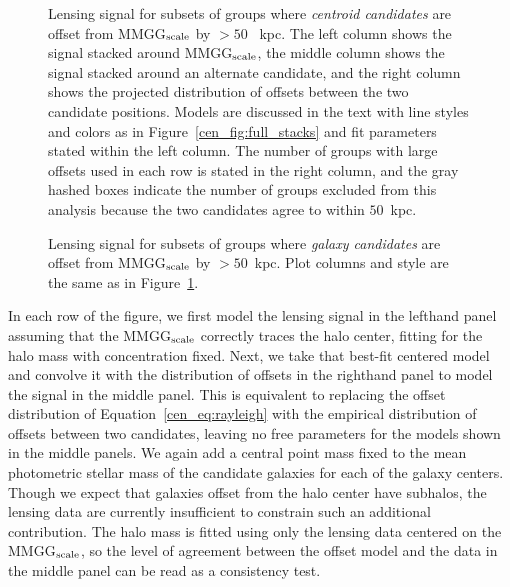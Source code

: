 \begin{figure*}[htb]
\caption{Lensing signal for subsets of groups where \textit{centroid
    candidates} are offset from MMGG$_{\rm scale}$ by $>50$~{\rm
    kpc}. The left column shows the signal stacked around MMGG$_{\rm
    scale}$, the middle column shows the signal stacked around an
  alternate candidate, and the right column shows the projected
  distribution of offsets between the two candidate positions. Models are
  discussed in the text with line styles and colors as in Figure~\ref{cen_fig:full_stacks}
  and fit parameters stated within the left column. The
  number of groups with large offsets used in each row is stated in
  the right column, and the gray hashed boxes indicate the number of
  groups excluded from this analysis because the two candidates agree
  to within $50$~{\rm kpc}.}
\label{cen_fig:diff_stacks_centroids}
\end{figure*}
 
\begin{figure*}[htb]
\caption{Lensing signal for subsets of groups where \textit{galaxy candidates}
  are offset from MMGG$_{\rm scale}$ by $>50$~{\rm kpc}. Plot columns
  and style are the same as in Figure~\ref{cen_fig:diff_stacks_centroids}.}
\label{cen_fig:diff_stacks_galaxies}
\end{figure*}
 
In each row of the figure, we first model the lensing signal in the
lefthand panel assuming that the MMGG$_{\rm scale}$ correctly traces
the halo center, fitting for the halo mass with concentration
fixed. Next, we take that best-fit centered model and convolve it with
the distribution of offsets in the righthand panel to model the signal
in the middle panel. This is equivalent to replacing the offset
distribution of Equation~\eqref{cen_eq:rayleigh} with the empirical
distribution of offsets between two candidates, leaving no free
parameters for the models shown in the middle panels. We again add a
central point mass fixed to the mean photometric stellar mass of the
candidate galaxies for each of the galaxy
centers. Though we expect that galaxies offset from
  the halo center have subhalos, the lensing data are currently insufficient
  to constrain such an additional contribution. The halo mass is
fitted using only the lensing data centered on the MMGG$_{\rm scale}$,
so the level of agreement between the offset model and the data in the
middle panel can be read as a consistency test.

